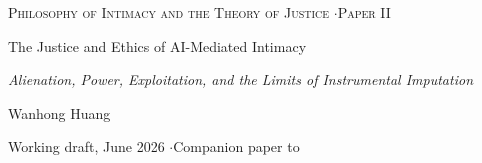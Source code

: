 \documentclass[11pt,a4paper]{article}
\begin{document}
\thispagestyle{empty}
\null\vfill
\begin{center}
{\footnotesize\color{rosedeep}\scshape Philosophy of Intimacy and the Theory of Justice \quad$\cdot$\quad Paper II\par}
\vspace{0.9em}
\coverrule\par
\vspace{1.6em}
{\color{warnred}\Large The Justice and Ethics of AI-Mediated Intimacy\par}
\vspace{1.0em}
{\color{warnred}\large\itshape Alienation, Power, Exploitation, and the Limits of Instrumental Imputation\par}
\vspace{2.4em}
\coverrule[0.25]\par
\vspace{1.4em}
{\large Wanhong Huang\par}
\vspace{0.5em}
{\footnotesize Working draft, June 2026 \quad$\cdot$\quad Companion paper to \textcite{huang2025toward}\par}
\end{center}
\vfill\null
\coverfootnote
\clearpage
\end{document}
